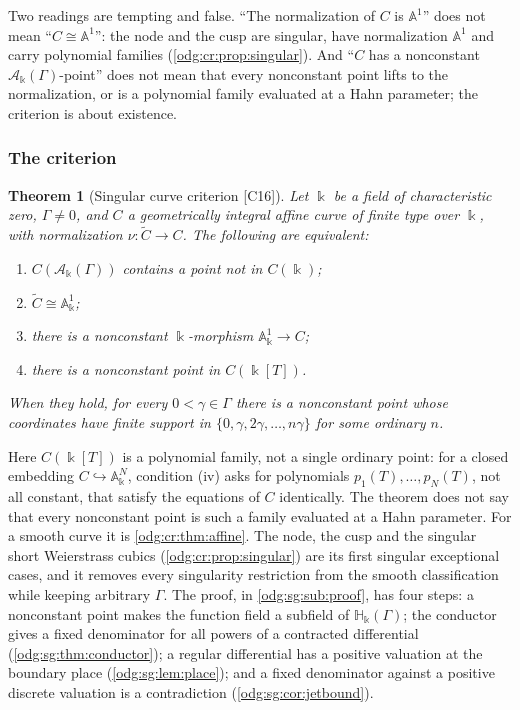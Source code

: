 \documentclass[11pt,oneside]{article}
\numberwithin{equation}{section}
\newtheorem{theorem}{Theorem}[section]
\theoremstyle{definition}
\theoremstyle{remark}
\newcommand{\src}[1]{\textup{\textsf{\small[#1]}}}
\newcommand{\crH}{\mathbb H_\Bbbk(\Gamma)}
\newcommand{\crA}{\mathcal A_\Bbbk(\Gamma)}
\newcommand{\Aff}{\mathbb A}
\begin{document}
Two readings are tempting and false. ``The normalization of $C$ is $\Aff^1$'' does not
mean ``$C\cong\Aff^1$'': the node and the cusp are singular, have normalization $\Aff^1$
and carry polynomial families (\cref{odg:cr:prop:singular}). And ``$C$ has a nonconstant
$\crA$-point'' does not mean that every nonconstant point lifts to the normalization, or
is a polynomial family evaluated at a Hahn parameter; the criterion is about existence.

\subsubsection{The criterion}\label{odg:sg:sub:criterion}

\begin{theorem}[Singular curve criterion \src{C16}]\label{odg:sg:thm:main}
Let $\Bbbk$ be a field of characteristic zero, $\Gamma\ne0$, and $C$ a geometrically
integral affine curve of finite type over $\Bbbk$, with normalization
$\nu:\widetilde C\to C$. The following are equivalent:
\begin{enumerate}[label=\textup{(\roman*)},leftmargin=*]
\item $C(\crA)$ contains a point not in $C(\Bbbk)$;
\item $\widetilde C\cong\Aff^1_\Bbbk$;
\item there is a nonconstant $\Bbbk$-morphism $\Aff^1_\Bbbk\to C$;
\item there is a nonconstant point in $C(\Bbbk[T])$.
\end{enumerate}
When they hold, for every $0<\gamma\in\Gamma$ there is a nonconstant point whose
coordinates have finite support in $\{0,\gamma,2\gamma,\ldots,n\gamma\}$ for some ordinary
$n$.
\end{theorem}

Here $C(\Bbbk[T])$ is a polynomial family, not a single ordinary point: for a closed
embedding $C\hookrightarrow\Aff^N_\Bbbk$, condition (iv) asks for polynomials
$p_1(T),\ldots,p_N(T)$, not all constant, that satisfy the equations of $C$ identically.
The theorem does not say that every nonconstant point is such a family evaluated at a
Hahn parameter. For a smooth curve it is \cref{odg:cr:thm:affine}. The node, the cusp and
the singular short Weierstrass cubics (\cref{odg:cr:prop:singular}) are its first
singular exceptional cases, and it removes every singularity restriction from the
smooth classification while keeping arbitrary $\Gamma$. The proof, in
\cref{odg:sg:sub:proof}, has four steps: a nonconstant point makes the function field a
subfield of $\crH$; the conductor gives a fixed denominator for all powers of a contracted
differential (\cref{odg:sg:thm:conductor}); a regular differential has a positive
valuation at the boundary place (\cref{odg:sg:lem:place}); and a fixed denominator
against a positive discrete valuation is a contradiction (\cref{odg:sg:cor:jetbound}).
\end{document}
